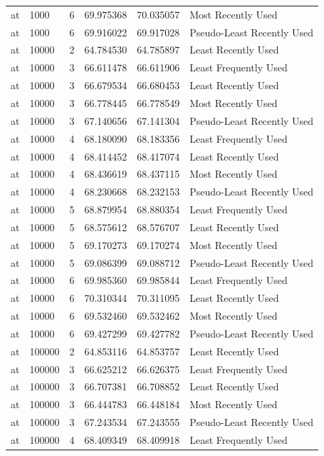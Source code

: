\begin{tabular}{llrrrl}
at & 1000 & 6 & 69.975368 & 70.035057 & Most Recently Used \\
at & 1000 & 6 & 69.916022 & 69.917028 & Pseudo-Least Recently Used \\
at & 10000 & 2 & 64.784530 & 64.785897 & Least Recently Used \\
at & 10000 & 3 & 66.611478 & 66.611906 & Least Frequently Used \\
at & 10000 & 3 & 66.679534 & 66.680453 & Least Recently Used \\
at & 10000 & 3 & 66.778445 & 66.778549 & Most Recently Used \\
at & 10000 & 3 & 67.140656 & 67.141304 & Pseudo-Least Recently Used \\
at & 10000 & 4 & 68.180090 & 68.183356 & Least Frequently Used \\
at & 10000 & 4 & 68.414452 & 68.417074 & Least Recently Used \\
at & 10000 & 4 & 68.436619 & 68.437115 & Most Recently Used \\
at & 10000 & 4 & 68.230668 & 68.232153 & Pseudo-Least Recently Used \\
at & 10000 & 5 & 68.879954 & 68.880354 & Least Frequently Used \\
at & 10000 & 5 & 68.575612 & 68.576707 & Least Recently Used \\
at & 10000 & 5 & 69.170273 & 69.170274 & Most Recently Used \\
at & 10000 & 5 & 69.086399 & 69.088712 & Pseudo-Least Recently Used \\
at & 10000 & 6 & 69.985360 & 69.985844 & Least Frequently Used \\
at & 10000 & 6 & 70.310344 & 70.311095 & Least Recently Used \\
at & 10000 & 6 & 69.532460 & 69.532462 & Most Recently Used \\
at & 10000 & 6 & 69.427299 & 69.427782 & Pseudo-Least Recently Used \\
at & 100000 & 2 & 64.853116 & 64.853757 & Least Recently Used \\
at & 100000 & 3 & 66.625212 & 66.626375 & Least Frequently Used \\
at & 100000 & 3 & 66.707381 & 66.708852 & Least Recently Used \\
at & 100000 & 3 & 66.444783 & 66.448184 & Most Recently Used \\
at & 100000 & 3 & 67.243534 & 67.243555 & Pseudo-Least Recently Used \\
at & 100000 & 4 & 68.409349 & 68.409918 & Least Frequently Used \\

\end{tabular}
